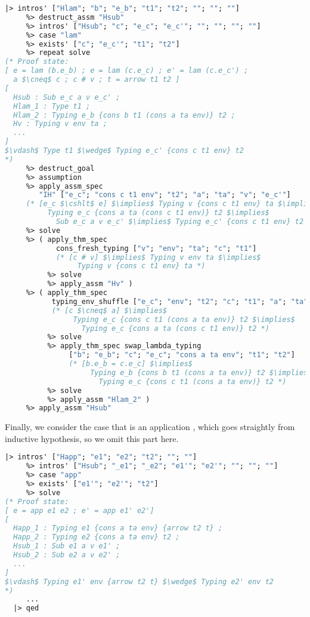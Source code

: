 \documentclass[english, mgr]{iithesis}
\newcommand{\lstt}[1]{\text{{\lstinline[columns=fixed,mathescape]|#1|}}}
\begin{document}
\begin{lstlisting}[mathescape,language=OCaml,escapebegin=\color{codegreen}]
  |> intros' ["Hlam"; "b"; "e_b"; "t1"; "t2"; ""; ""; ""]
     %> destruct_assm "Hsub"
     %> intros' ["Hsub"; "c"; "e_c"; "e_c'"; ""; ""; ""; ""]
     %> case "lam"
     %> exists' ["c"; "e_c'"; "t1"; "t2"]
     %> repeat solve
(* Proof state:
[ e = lam (b.e_b) ; e = lam (c.e_c) ; e' = lam (c.e_c') ;
  a $\cneq$ c ; c # v ; t = arrow t1 t2 ]
[
  Hsub : Sub e_c a v e_c' ;
  Hlam_1 : Type t1 ;
  Hlam_2 : Typing e_b {cons b t1 (cons a ta env)} t2 ;
  Hv : Typing v env ta ;
  ...
]
$\vdash$ Type t1 $\wedge$ Typing e_c' {cons c t1 env} t2
*)
     %> destruct_goal
     %> assumption
     %> apply_assm_spec
        "IH" ["e_c"; "cons c t1 env"; "t2"; "a"; "ta"; "v"; "e_c'"]
     (* [e_c $\cshlt$ e] $\implies$ Typing v {cons c t1 env} ta $\implies$
          Typing e_c {cons a ta (cons c t1 env)} t2 $\implies$
            Sub e_c a v e_c' $\implies$ Typing e_c' {cons c t1 env} t2  *)
     %> solve
     %> ( apply_thm_spec
            cons_fresh_typing ["v"; "env"; "ta"; "c"; "t1"]
            (* [c # v] $\implies$ Typing v env ta $\implies$
                 Typing v {cons c t1 env} ta *)
          %> solve
          %> apply_assm "Hv" )
     %> ( apply_thm_spec
           typing_env_shuffle ["e_c"; "env"; "t2"; "c"; "t1"; "a"; "ta"]
           (* [c $\cneq$ a] $\implies$
                Typing e_c {cons c t1 (cons a ta env)} t2 $\implies$
                  Typing e_c {cons a ta (cons c t1 env)} t2 *)
          %> solve
          %> apply_thm_spec swap_lambda_typing
               ["b"; "e_b"; "c"; "e_c"; "cons a ta env"; "t1"; "t2"]
               (* [b.e_b = c.e_c] $\implies$
                    Typing e_b {cons b t1 (cons a ta env)} t2 $\implies$
                      Typing e_c {cons c t1 (cons a ta env)} t2 *)
          %> solve
          %> apply_assm "Hlam_2" )
     %> apply_assm "Hsub"
\end{lstlisting}
Finally, we consider the case that \lstt{e} is an application \lstt{e1 e2},
which goes straightly from inductive hypothesis, so we omit this part here.
\begin{lstlisting}[mathescape,language=OCaml,escapebegin=\color{codegreen}]
  |> intros' ["Happ"; "e1"; "e2"; "t2"; ""; ""]
     %> intros' ["Hsub"; "_e1"; "_e2"; "e1'"; "e2'"; ""; ""; ""]
     %> case "app"
     %> exists' ["e1'"; "e2'"; "t2"]
     %> solve
(* Proof state:
[ e = app e1 e2 ; e' = app e1' e2']
[
  Happ_1 : Typing e1 {cons a ta env} {arrow t2 t} ;
  Happ_2 : Typing e2 {cons a ta env} t2 ;
  Hsub_1 : Sub e1 a v e1' ;
  Hsub_2 : Sub e2 a v e2' ;
  ...
]
$\vdash$ Typing e1' env {arrow t2 t} $\wedge$ Typing e2' env t2
*)
     ...
  |> qed
\end{lstlisting}
\end{document}
